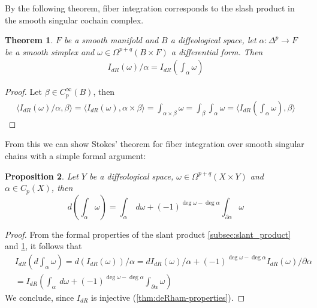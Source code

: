 \documentclass{scrartcl}
\theoremstyle{plain}
\newtheorem{theorem}{Theorem}[section]
\newtheorem{proposition}[theorem]{Proposition}
\theoremstyle{definition}
\begin{document}
By the following theorem, fiber integration corresponds to the slash product in the smooth singular cochain complex.
\begin{theorem}\label{thm:fiber-integral-slash-product}
    $F$ be a smooth manifold and $B$ a diffeological space, let $\alpha\colon\Delta^p\to F$ be a smooth simplex and $\omega\in\Omega^{p+q}(B\times F)$ a differential form. Then
    \begin{align*}
        I_{dR}(\omega) / \alpha = I_{dR}\left(\int_{\alpha} \omega\right)
    \end{align*}
\end{theorem}
\begin{proof}
    Let $\beta\in C^\infty_p(B)$, then
    \begin{align*}
        \langle I_{dR}(\omega) / \alpha, \beta\rangle = \langle I_{dR}(\omega), \alpha\times \beta\rangle = \int_{\alpha\times \beta} \omega = \int_\beta \int_\alpha\omega = \langle I_{dR}\left(\int_{\alpha}\omega\right), \beta\rangle
    \end{align*}
\end{proof}

From this we can show Stokes' theorem for fiber integration over smooth singular chains with a simple formal argument:
\begin{proposition}\label{thm:fiber-stokes}
    Let $Y$ be a diffeological space, $\omega\in\Omega^{p+q}(X\times Y)$ and $\alpha\in C_p(X)$, then
    $$d\left(\int_\alpha\omega\right) = \int_\alpha\ d\omega + (-1)^{\deg \omega - \deg\alpha}\int_{\partial \alpha} \omega$$
\end{proposition}
\begin{proof}
    From the formal properties of the slant product \cref{subsec:slant_product} and \ref{thm:fiber-integral-slash-product}, it follows that
    \begin{align*}
        &I_{dR}\left(d\int_\alpha\omega\right) = d (I_{dR}(\omega)) / \alpha = dI_{dR}(\omega) / \alpha + (-1)^{\deg \omega - \deg \alpha}I_{dR}(\omega) / \partial \alpha \\&= I_{dR}\left(\int_\alpha\ d\omega + (-1)^{\deg \omega - \deg\alpha}\int_{\partial \alpha} \omega\right)
    \end{align*}
    We conclude, since $I_{dR}$ is injective (\ref{thm:deRham-properties}).
\end{proof}
\end{document}
